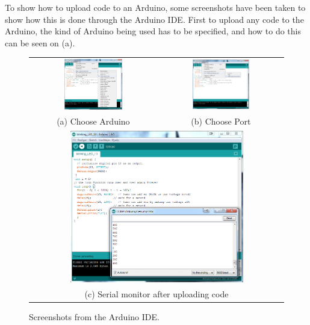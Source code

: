 To show how to upload code to an Arduino, some screenshots have been taken to show how this is done through the Arduino IDE.
First to upload any code to the Arduino, the kind of Arduino being used has to be specified, and how to do this can be seen on  (a).
\begin{figure}
\begin{tabular}{cc}
  \includegraphics[width=0.48\textwidth]{Figures/ChooseArduino.png} &   \includegraphics[width=0.48\textwidth]{Figures/ChoosePort.png} \\
(a) Choose Arduino & (b) Choose Port \\[6pt]

\multicolumn{2}{c}{\includegraphics[width=0.7\textwidth]{Figures/SerialMonitor}} \\
\multicolumn{2}{c}{(c) Serial monitor after uploading code}
\end{tabular}
\caption{Screenshots from the Arduino IDE.}
\label{tab:ArduinoScreenshots}
\end{figure}


